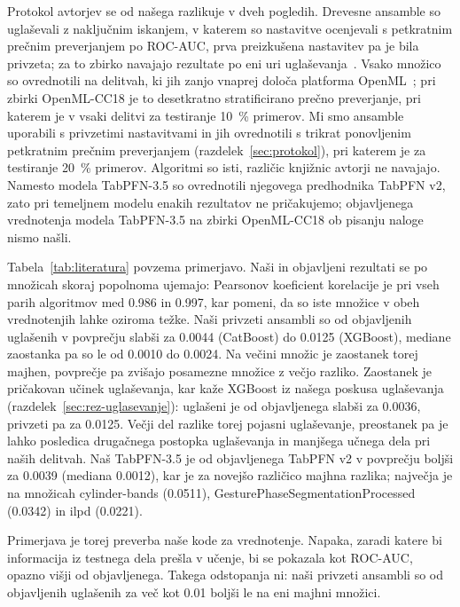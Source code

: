 \documentclass[a4paper,12pt,openright]{book}
\begin{document}
Protokol avtorjev se od našega razlikuje v dveh pogledih. Drevesne ansamble so
uglaševali z naključnim iskanjem, v katerem so nastavitve ocenjevali s
petkratnim prečnim preverjanjem po ROC-AUC, prva preizkušena nastavitev pa je
bila privzeta; za to zbirko navajajo rezultate po eni uri
uglaševanja~\cite{hollmann2025tabpfn}. Vsako množico so ovrednotili na
delitvah, ki jih zanjo vnaprej določa platforma
OpenML~\cite{hollmann2025tabpfn}; pri zbirki OpenML-CC18 je to desetkratno
stratificirano prečno preverjanje, pri katerem je v vsaki delitvi za testiranje
\SI{10}{\percent} primerov. Mi smo ansamble uporabili s privzetimi nastavitvami
in jih ovrednotili s trikrat ponovljenim petkratnim prečnim preverjanjem
(razdelek~\ref{sec:protokol}), pri katerem je za testiranje
\SI{20}{\percent} primerov. Algoritmi so isti, različic knjižnic avtorji ne
navajajo. Namesto modela TabPFN-3.5 so ovrednotili njegovega predhodnika
TabPFN v2, zato pri temeljnem modelu enakih rezultatov ne pričakujemo;
objavljenega vrednotenja modela TabPFN-3.5 na zbirki OpenML-CC18 ob pisanju
naloge nismo našli.



Tabela~\ref{tab:literatura} povzema primerjavo. Naši in objavljeni rezultati
se po množicah skoraj popolnoma ujemajo: Pearsonov koeficient korelacije je pri
vseh parih algoritmov med \num{0.986} in \num{0.997}, kar pomeni, da so iste
množice v obeh vrednotenjih lahke oziroma težke. Naši privzeti ansambli so od
objavljenih uglašenih v povprečju slabši za \num{0.0044} (CatBoost) do
\num{0.0125} (XGBoost), mediane zaostanka pa so le od \num{0.0010} do
\num{0.0024}. Na večini množic je zaostanek torej majhen, povprečje pa
zvišajo posamezne množice z večjo razliko. Zaostanek je pričakovan učinek uglaševanja, kar kaže XGBoost iz
našega poskusa uglaševanja (razdelek~\ref{sec:rez-uglasevanje}): uglašeni je
od objavljenega slabši za \num{0.0036}, privzeti pa za \num{0.0125}. Večji del
razlike torej pojasni uglaševanje, preostanek pa je lahko posledica drugačnega
postopka uglaševanja in manjšega učnega dela pri naših delitvah. Naš
TabPFN-3.5 je od objavljenega TabPFN v2 v povprečju boljši za \num{0.0039}
(mediana \num{0.0012}), kar je za novejšo različico majhna razlika; največja je
na množicah cylinder-bands (\num{0.0511}), GesturePhaseSegmentationProcessed
(\num{0.0342}) in ilpd (\num{0.0221}).

Primerjava je torej preverba naše kode za vrednotenje. Napaka, zaradi katere
bi informacija iz testnega dela prešla v učenje, bi se pokazala kot ROC-AUC,
opazno višji od objavljenega. Takega odstopanja ni: naši privzeti ansambli so
od objavljenih uglašenih za več kot \num{0.01} boljši le na eni majhni
množici.
\end{document}

